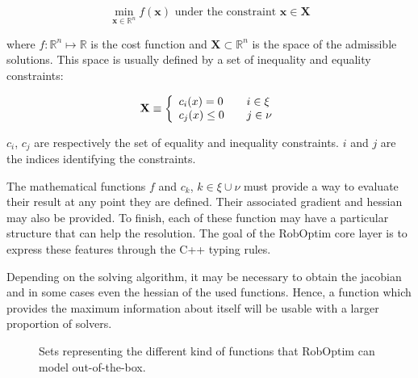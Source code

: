 \documentclass[conference,final,a4paper,twocolumn,9pt]{IEEEtran}
\begin{document}
\begin{equation}\label{eq:optimization}
  \min_{\mathbf{x} \in \mathbb{R}^n} f(\mathbf{x}) \text{ under the constraint } \mathbf{x} \in \mathbf{X}
\end{equation}

where $f : \mathbb{R}^n \mapsto \mathbb{R}$ is the cost function and
$\mathbf{X} \subset \mathbb{R}^n$ is the space of the admissible
solutions. This space is usually defined by a set of inequality and
equality constraints:

\begin{equation}
  \mathbf{X} \equiv \left\{
  \begin{array}{l l}
    c_i (x) = 0    & \quad i \in \xi \\
    c_j (x) \leq 0 & \quad j \in \nu \\
  \end{array} \right.
\end{equation}

$c_i$, $c_j$ are respectively the set of equality and inequality
constraints. $i$ and $j$ are the indices identifying the constraints.

The mathematical functions $f$ and $c_k$, $k \in \xi \cup \nu$ must
provide a way to evaluate their result at any point they are
defined. Their associated gradient and hessian may also be
provided. To finish, each of these function may have a particular
structure that can help the resolution. The goal of the RobOptim core
layer is to express these features through the C++ typing rules.


Depending on the solving algorithm, it may be necessary to obtain the
jacobian and in some cases even the hessian of the used
functions. Hence, a function which provides the maximum information
about itself will be usable with a larger proportion of solvers.

\begin{figure}[ht!]
  \begin{center}
  \end{center}
  \caption{Sets representing the different kind of functions that
    RobOptim can model out-of-the-box.}\label{fig:functions}
\end{figure}
\end{document}
